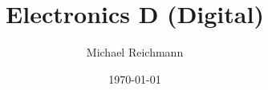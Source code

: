 \documentclass[final, xcolor=dvipsnames, table]{beamer}
\title[Electronics D]{Electronics D (Digital)}
\author[M. Reichmann]{Michael Reichmann}
\institute[ETH Z\"urich]{Institute of Particle Physics and Astrophysics, ETH Z\"urich}
\date{\today}
\begin{document}
\begin{frame}
\begin{columns}[t]
	\begin{column}{.475\linewidth}
		\vspace*{-.05\textheight}
		\vspace*{-.05\textheight}
		
	\end{column}
	\begin{column}{.475\linewidth}
		\vspace*{-.05\textheight}
		
	\end{column}
\end{columns}
\end{frame}
\end{document}
